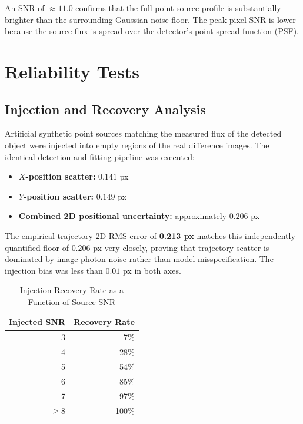 \documentclass[11pt,a4paper]{article}
\begin{document}
An SNR of $\approx 11.0$ confirms that the full point-source profile is substantially brighter than the surrounding Gaussian noise floor. The peak-pixel SNR is lower because the source flux is spread over the detector's point-spread function (PSF).

\section{Reliability Tests}

\subsection{Injection and Recovery Analysis}

Artificial synthetic point sources matching the measured flux of the detected object were injected into empty regions of the real difference images. The identical detection and fitting pipeline was executed:
\begin{itemize}[noitemsep]
    \item \textbf{$X$-position scatter:} $0.141$ px
    \item \textbf{$Y$-position scatter:} $0.149$ px
    \item \textbf{Combined 2D positional uncertainty:} approximately $0.206$ px
\end{itemize}

The empirical trajectory 2D RMS error of \textbf{0.213 px} matches this independently quantified floor of $0.206$ px very closely, proving that trajectory scatter is dominated by image photon noise rather than model misspecification. The injection bias was less than $0.01$ px in both axes.

\begin{table}[htbp]
\centering
\caption{Injection Recovery Rate as a Function of Source SNR}
\label{tab:injection_recovery}
\begin{tabular}{rr}
\toprule
\textbf{Injected SNR} & \textbf{Recovery Rate} \\
\midrule
3           & 7\%   \\
4           & 28\%  \\
5           & 54\%  \\
6           & 85\%  \\
7           & 97\%  \\
$\ge 8$     & 100\% \\
\bottomrule
\end{tabular}
\end{table}
\end{document}
